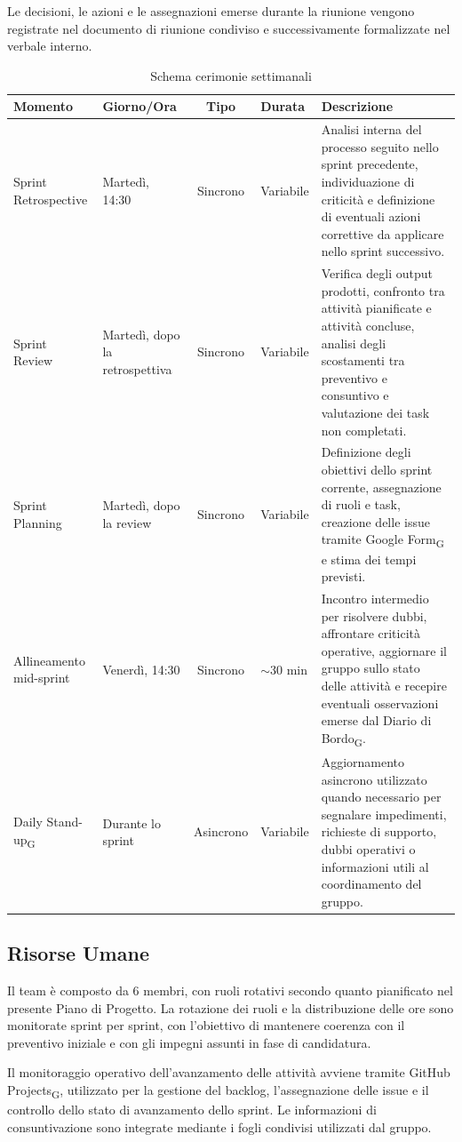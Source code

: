 Le decisioni, le azioni e le assegnazioni emerse durante la riunione vengono
registrate nel documento di riunione condiviso e successivamente formalizzate
nel verbale interno.

\begin{table}[H]
\centering
\renewcommand{\arraystretch}{1.3}
\begin{tabularx}{\textwidth}{|p{2.5cm}|p{2.2cm}|c|p{2cm}|X|}
    \hline
    \textbf{Momento} & \textbf{Giorno/Ora} & \textbf{Tipo} &
    \textbf{Durata} & \textbf{Descrizione} \\
    \hline
    Sprint Retrospective
        & Martedì, 14:30 & Sincrono & Variabile
        & Analisi interna del processo seguito nello sprint precedente,
          individuazione di criticità e definizione di eventuali azioni correttive
          da applicare nello sprint successivo. \\
    \hline
    Sprint Review
        & Martedì, dopo la retrospettiva & Sincrono & Variabile
        & Verifica degli output prodotti, confronto tra attività pianificate e
          attività concluse, analisi degli scostamenti tra preventivo e consuntivo
          e valutazione dei task non completati. \\
    \hline
    Sprint Planning
        & Martedì, dopo la review & Sincrono & Variabile
        & Definizione degli obiettivi dello sprint corrente, assegnazione di ruoli
          e task, creazione delle issue tramite Google Form\textsubscript{G} e
          stima dei tempi previsti. \\
    \hline
    Allineamento mid-sprint
        & Venerdì, 14:30 & Sincrono & $\sim$30 min
        & Incontro intermedio per risolvere dubbi, affrontare criticità operative,
          aggiornare il gruppo sullo stato delle attività e recepire eventuali
          osservazioni emerse dal Diario di Bordo\textsubscript{G}. \\
    \hline
    Daily Stand-up\textsubscript{G}
        & Durante lo sprint & Asincrono & Variabile
        & Aggiornamento asincrono utilizzato quando necessario per segnalare
          impedimenti, richieste di supporto, dubbi operativi o informazioni utili al
          coordinamento del gruppo.\\
    \hline
\end{tabularx}
\caption{Schema cerimonie settimanali}
\end{table}

\subsection{Risorse Umane}

Il team è composto da 6 membri, con ruoli rotativi secondo quanto pianificato
nel presente Piano di Progetto. La rotazione dei ruoli e la distribuzione delle
ore sono monitorate sprint per sprint, con l'obiettivo di mantenere coerenza con
il preventivo iniziale e con gli impegni assunti in fase di candidatura.

Il monitoraggio operativo dell'avanzamento delle attività avviene tramite
GitHub Projects\textsubscript{G}, utilizzato per la gestione del backlog,
l'assegnazione delle issue e il controllo dello stato di avanzamento dello
sprint. Le informazioni di consuntivazione sono integrate mediante i fogli
condivisi utilizzati dal gruppo.
